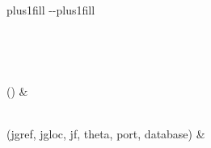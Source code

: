 \documentclass[letterpaper,10pt,english]{sphinxmanual}
\begin{document}
\begin{fulllineitems}
\begin{savenotes}
\sphinxatlongtablestart
\sphinxthistablewithglobalstyle
\sphinxthistablewithnovlinesstyle
\makeatletter
  \LTleft \@totalleftmargin plus1fill
  \LTright\dimexpr\columnwidth-\@totalleftmargin-\linewidth\relax plus1fill
\makeatother
\begin{longtable}{}
\sphinxtoprule
\endfirsthead

\\
\sphinxtoprule
\endhead

\sphinxbottomrule
{}\\
\endfoot

\endlastfoot
\sphinxtableatstartofbodyhook

\sphinxAtStartPar
{}()
&
\sphinxAtStartPar

\\
\sphinxhline
\sphinxAtStartPar
{}(jgref, jgloc, jf, theta, port, database)
&
\sphinxAtStartPar


\end{longtable}
\end{savenotes}
\end{fulllineitems}
\end{document}
